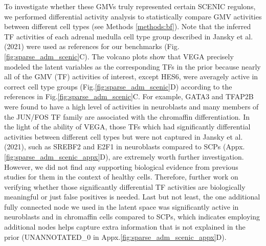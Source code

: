 To investigate whether these GMVs truly represented certain SCENIC regulons, we performed differential activity analysis to statistically compare GMV activities between different cell types (see Methods \ref{methods:bf}). Note that the inferred TF activities of each adrenal medulla cell type group described in Jansky et al. (2021) were used as references for our benchmarks (Fig.\ref{fig:sparse_adm_scenic}C). The volcano plots show that VEGA precisely modeled the latent variables as the corresponding TFs in the prior because nearly all of the GMV (TF) activities of interest, except HES6, were averagely active in correct cell type groups (Fig.\ref{fig:sparse_adm_scenic}D) according to the references in Fig.\ref{fig:sparse_adm_scenic}C. For example, GATA3 and TFAP2B were found to have a high level of activities in neuroblasts and many members of the JUN/FOS TF family are associated with the chromaffin differentiation\cite{Jansky2021}. In the light of the ability of VEGA, those TFs which had significantly differential activities between different cell types but were not captured in Jansky et al. (2021), such as SREBF2 and E2F1 in neuroblasts compared to SCPs (Appx.\ref{fig:sparse_adm_scenic_appx}D), are extremely worth further investigation. However, we did not find any supporting biological evidence from previous studies for them in the context of healthy cells. Therefore, further work on verifying whether those significantly differential TF activities are biologically meaningful or just false positives is needed. Last but not least, the one additional fully connected node we used in the latent space was significantly active in neuroblasts and in chromaffin cells compared to SCPs, which indicates employing additional nodes helps capture extra information that is not explained in the prior (UNANNOTATED\_0 in Appx.\ref{fig:sparse_adm_scenic_appx}D).

\newpage

